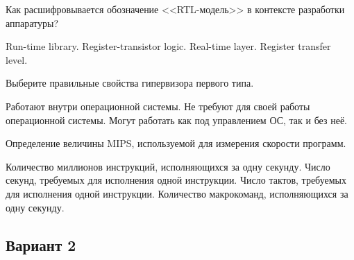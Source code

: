 \begin{questions}
\question[3] Как расшифровывается обозначение <<RTL-модель>> в контексте разработки аппаратуры?
\begin{choices}
\choice Run-time library.
\choice Register-transistor logic.
\choice Real-time layer.
\correctchoice Register transfer level.
\end{choices}

\question[3] Выберите правильные свойства гипервизора первого типа.
\begin{choices}
\choice Работают внутри операционной системы.
\correctchoice Не требуют для своей работы операционной системы.
\choice Могут работать как под управлением ОС, так и без неё.
\end{choices}

\question[3] Определение величины MIPS, используемой для измерения скорости программ.
\begin{choices}
\correctchoice Количество миллионов инструкций, исполняющихся за одну секунду.
\choice Число секунд, требуемых для исполнения одной инструкции.
\choice Число тактов, требуемых для исполнения одной инструкции.
\choice Количество макрокоманд, исполняющихся за одну секунду.
\end{choices}
    

\end{questions}
\subsection*{Вариант 2}

